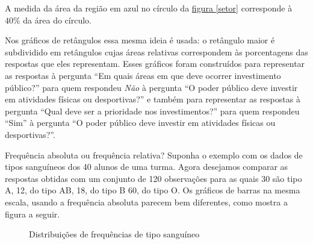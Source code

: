 {A medida da área da região em azul no círculo da \hyperref[setor]{figura \ref{setor}} corresponde à $40\%$ da área do círculo.

Nos gráficos de retângulos essa mesma ideia é usada: o retângulo maior é subdividido em retângulos cujas áreas relativas correspondem às porcentagens das respostas que eles representam. Esses gráficos foram construídos para representar as respostas à pergunta “Em quais áreas em que deve ocorrer investimento público?”{} para quem respondeu \textit{Não} à pergunta “O poder público deve investir em atividades físicas ou desportivas?”{} e também para representar as respostas à pergunta “Qual deve ser a prioridade nos investimentos?” para quem respondeu “Sim”{} à pergunta “O poder público deve investir em atividades físicas ou desportivas?”.

\begin{example}{Frequência absoluta ou frequência relativa?}
Suponha o exemplo com os dados de tipos sanguíneos dos 40 alunos de uma turma. Agora desejamos comparar as respostas obtidas com um conjunto de 120 observações para as quais 30 são tipo A, 12, do tipo AB, 18, do tipo B 60, do tipo O. Os gráficos de barras na mesma escala, usando a frequência absoluta parecem bem diferentes, como mostra a figura a seguir.

\begin{figure}[H]
\centering
Distribuições de frequências de tipo sanguíneo
\vspace{2em}

\hspace{1em}
\end{figure}
\end{example}}
